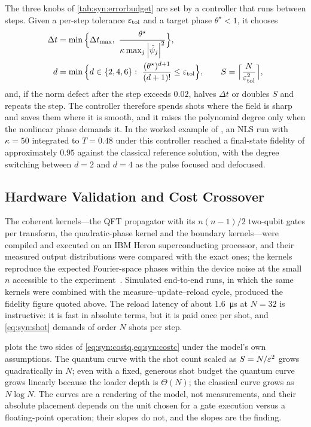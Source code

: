 The three knobs of \cref{tab:syn:errorbudget} are set by a controller that runs between steps. Given a per-step tolerance $\varepsilon_{\mathrm{tol}}$ and a target phase $\theta^{\star}<1$, it chooses
\begin{equation}\label{eq:syn:controller}
\begin{aligned}
  \Delta t&=\min\Big\{\Delta t_{\max},\ \frac{\theta^{\star}}{\kappa\max_j\abs{\hat\psi_j}^{2}}\Big\},\\
  d&=\min\Big\{d\in\{2,4,6\}:\ \frac{(\theta^{\star})^{d+1}}{(d+1)!}\le\eps_{\mathrm{tol}}\Big\},\qquad
  S=\Big\lceil\frac{N}{\eps_{\mathrm{tol}}^{2}}\Big\rceil,
\end{aligned}
\end{equation}
and, if the norm defect after the step exceeds $0.02$, halves $\Delta t$ or doubles $S$ and repeats the step. The controller therefore spends shots where the field is sharp and saves them where it is smooth, and it raises the polynomial degree only when the nonlinear phase demands it. In the worked example of \cite{guo2026nonlinearwaves}, an NLS run with $\kappa=50$ integrated to $T=0.48$ under this controller reached a final-state fidelity of approximately $0.95$ against the classical reference solution, with the degree switching between $d=2$ and $d=4$ as the pulse focused and defocused.

\subsection{Hardware Validation and Cost Crossover}\label{sec:syn:waves-results}

The coherent kernels---the QFT propagator with its $n(n-1)/2$ two-qubit gates per transform, the quadratic-phase kernel and the boundary kernels---were compiled and executed on an IBM Heron superconducting processor, and their measured output distributions were compared with the exact ones; the kernels reproduce the expected Fourier-space phases within the device noise at the small $n$ accessible to the experiment~\cite{guo2026nonlinearwaves}. Simulated end-to-end runs, in which the same kernels were combined with the measure--update--reload cycle, produced the fidelity figure quoted above. The reload latency of about \SI{1.6}{\micro\second} at $N=32$ is instructive: it is fast in absolute terms, but it is paid once per shot, and \cref{eq:syn:shot} demands of order $N$ shots per step.

 plots the two sides of \cref{eq:syn:costq,eq:syn:costc} under the model's own assumptions. The quantum curve with the shot count scaled as $S=N/\varepsilon^{2}$ grows quadratically in $N$; even with a fixed, generous shot budget the quantum curve grows linearly because the loader depth is $\Theta(N)$; the classical curve grows as $N\log N$. The curves are a rendering of the model, not measurements, and their absolute placement depends on the unit chosen for a gate execution versus a floating-point operation; their slopes do not, and the slopes are the finding.

